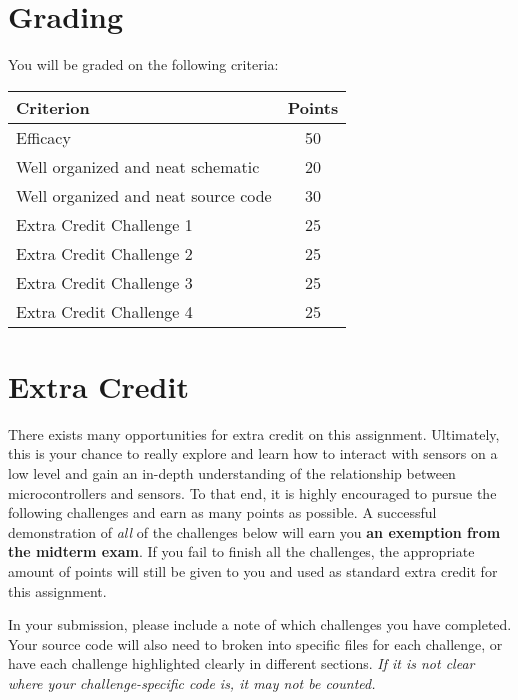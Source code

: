 \section*{Grading} 
You will be graded on the following criteria:
\begin{table}[h!]
    \begin{tabular}{l | c}
        \toprule
        Criterion & Points \\

        \midrule
        Efficacy & 50 \\
        Well organized and neat schematic & 20 \\
        Well organized and neat source code & 30 \\
        Extra Credit Challenge 1 \footnotemark & 25 \\
        Extra Credit Challenge 2 & 25 \\
        Extra Credit Challenge 3 & 25 \\
        Extra Credit Challenge 4 & 25 \\

        \bottomrule
    \end{tabular}
\end{table}

\section*{Extra Credit} 
There exists many opportunities for extra credit on this assignment. 
Ultimately, this is your chance to really explore and learn how to interact with sensors on a low level and gain an in-depth understanding of the relationship between microcontrollers and sensors.
To that end, it is highly encouraged to pursue the following challenges and earn as many points as possible.
A successful demonstration of \emph{all} of the challenges below will earn you \textbf{an exemption from the midterm exam}.
If you fail to finish all the challenges, the appropriate amount of points will still be given to you and used as standard extra credit for this assignment.

In your submission, please include a note of which challenges you have completed.
Your source code will also need to broken into specific files for each challenge, or have each challenge highlighted clearly in different sections.
\emph{If it is not clear where your challenge-specific code is, it may not be counted.}

